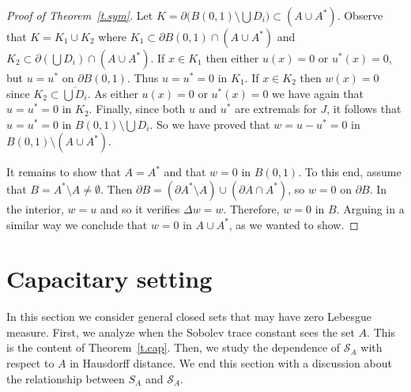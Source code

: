 \documentclass[11pt]{amsart}
\theoremstyle{remark}
\numberwithin{equation}{section}
\newcommand{\cS}{\mathcal{S}}
\begin{document}
\begin{proof}[Proof of Theorem~\ref{t.sym}]
Let $K=\partial\big(B(0,1)\setminus\bigcup D_i\big)\subset(A\cup A^*)$. Observe that $K=K_1\cup K_2$ where $K_1\subset\partial B(0,1)\cap(A\cup A^*)$ and $K_2\subset\partial(\bigcup D_i)\cap(A\cup A^*)$. If $x\in K_1$ then either $u(x)=0$ or $u^*(x)=0$, but $u=u^*$ on $\partial B(0,1)$. Thus $u=u^*=0$ in $K_1$. If $x\in K_2$ then $w(x)=0$ since $K_2\subset\overline{\bigcup D_i}$. As either $u(x)=0$ or $u^*(x)=0$ we have again that $u=u^*=0$ in $K_2$. Finally, since both $u$ and $u^*$ are extremals for $J$, it follows that $u=u^*=0$ in $B(0,1)\setminus\bigcup D_i$. So we have proved that $w=u-u^*=0$ in $B(0,1)\setminus(A\cup A^*)$.

It remains to show that $A=A^*$ and that $w=0$ in $B(0,1)$. To this end, assume that $B=A^*\setminus A\neq\emptyset$. Then $\partial B=(\partial A^*\setminus A)\cup(\partial A\cap A^*)$, so $w=0$ on $\partial B$. In the interior, $w=u$ and so it verifies $\Delta w=w$. Therefore, $w=0$ in $B$. Arguing in a similar way we conclude that $w=0$ in $A\cup A^*$, as we wanted to show.
\end{proof}

\section{Capacitary setting}\label{sec.cap}

In this section we consider general closed sets that may have zero Lebesgue measure. First, we analyze when the Sobolev trace constant sees the set $A$. This is the content of Theorem~\ref{t.cap}. Then, we study the dependence of $\cS_A$ with respect to $A$ in Hausdorff distance. We end this section with a discussion about the relationship between $S_A$ and $\cS_A$.
\end{document}

